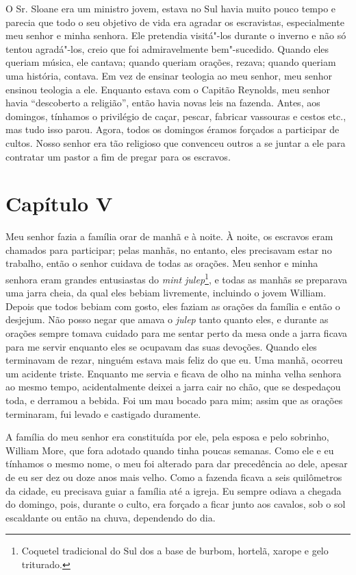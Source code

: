 O Sr. Sloane era um ministro jovem, estava no Sul havia muito pouco
tempo e parecia que todo o seu objetivo de vida era agradar os
escravistas, especialmente meu senhor e minha senhora. Ele pretendia
visitá"-los durante o inverno e não só tentou agradá"-los, creio que foi
admiravelmente bem"-sucedido. Quando eles queriam música, ele cantava;
quando queriam orações, rezava; quando queriam uma história, contava. Em
vez de ensinar teologia ao meu senhor, meu senhor ensinou teologia a
ele. Enquanto estava com o Capitão Reynolds, meu senhor havia
``descoberto a religião'', então havia novas leis na fazenda. Antes, aos
domingos, tínhamos o privilégio de caçar, pescar, fabricar vassouras e
cestos etc., mas tudo isso parou. Agora, todos os domingos éramos
forçados a participar de cultos. Nosso senhor era tão religioso que
convenceu outros a se juntar a ele para contratar um pastor a fim de
pregar para os escravos.

\chapter{Capítulo V}

Meu senhor fazia a família orar de manhã e à noite. À noite, os escravos
eram chamados para participar; pelas manhãs, no entanto, eles precisavam
estar no trabalho, então o senhor cuidava de todas as orações. Meu
senhor e minha senhora eram grandes entusiastas do \emph{mint
julep}\footnote{Coquetel tradicional do Sul dos  a base de burbom,
  hortelã, xarope e gelo triturado.}, e todas as manhãs se preparava uma
jarra cheia, da qual eles bebiam livremente, incluindo o jovem William.
Depois que todos bebiam com gosto, eles faziam as orações da família e
então o desjejum. Não posso negar que amava o \emph{julep} tanto quanto
eles, e durante as orações sempre tomava cuidado para me sentar perto da
mesa onde a jarra ficava para me servir enquanto eles se ocupavam das
suas devoções. Quando eles terminavam de rezar, ninguém estava mais
feliz do que eu. Uma manhã, ocorreu um acidente triste. Enquanto me
servia e ficava de olho na minha velha senhora ao mesmo tempo,
acidentalmente deixei a jarra cair no chão, que se despedaçou toda, e
derramou a bebida. Foi um mau bocado para mim; assim que as orações
terminaram, fui levado e castigado duramente.

A família do meu senhor era constituída por ele, pela esposa e pelo
sobrinho, William More, que fora adotado quando tinha poucas semanas.
Como ele e eu tínhamos o mesmo nome, o meu foi alterado para dar
precedência ao dele, apesar de eu ser dez ou doze anos mais velho. Como
a fazenda ficava a seis quilômetros da cidade, eu precisava guiar a
família até a igreja. Eu sempre odiava a chegada do domingo, pois,
durante o culto, era forçado a ficar junto aos cavalos, sob o sol
escaldante ou então na chuva, dependendo do dia.

